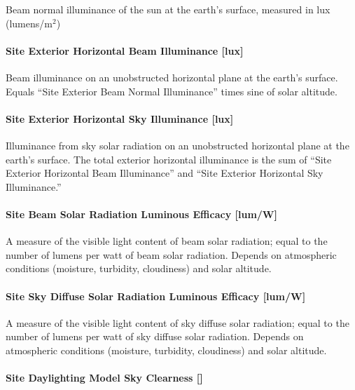 Beam normal illuminance of the sun at the earth's surface, measured in lux (lumens/m\(^{2}\))

\paragraph{Site Exterior Horizontal Beam Illuminance {[}lux{]}}\label{site-exterior-horizontal-beam-illuminance-lux}

Beam illuminance on an unobstructed horizontal plane at the earth's surface. Equals ``Site Exterior Beam Normal Illuminance'' times sine of solar altitude.

\paragraph{Site Exterior Horizontal Sky Illuminance {[}lux{]}}\label{site-exterior-horizontal-sky-illuminance-lux}

Illuminance from sky solar radiation on an unobstructed horizontal plane at the earth's surface. The total exterior horizontal illuminance is the sum of ``Site Exterior Horizontal Beam Illuminance'' and ``Site Exterior Horizontal Sky Illuminance.''

\paragraph{Site Beam Solar Radiation Luminous Efficacy {[}lum/W{]}}\label{site-beam-solar-radiation-luminous-efficacy-lumw}

A measure of the visible light content of beam solar radiation; equal to the number of lumens per watt of beam solar radiation. Depends on atmospheric conditions (moisture, turbidity, cloudiness) and solar altitude.

\paragraph{Site Sky Diffuse Solar Radiation Luminous Efficacy {[}lum/W{]}}\label{site-sky-diffuse-solar-radiation-luminous-efficacy-lumw}

A measure of the visible light content of sky diffuse solar radiation; equal to the number of lumens per watt of sky diffuse solar radiation. Depends on atmospheric conditions (moisture, turbidity, cloudiness) and solar altitude.

\paragraph{\texorpdfstring{Site Daylighting Model Sky Clearness {[]}}{Site Daylighting Model Sky Clearness }}\label{site-daylighting-model-sky-clearness}

